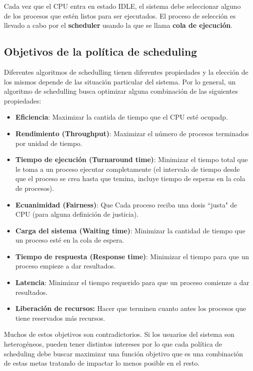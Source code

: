 	Cada vez que el CPU entra en estado IDLE, el sistema debe seleccionar alguno de los procesos que estén listos para ser ejecutados. El proceso de selección es llevado a cabo por el \textbf{scheduler} usando la que se llama \textbf{cola de ejecución}.
	
	\subsection{Objetivos de la política de scheduling}
	Diferentes algoritmos de schedulling tienen diferentes propiedades y la elección de los mismos depende de las situación particular del sistema. Por lo general, un algoritmo de schedulling busca optimizar alguna combinación de las siguientes propiedades:
	
	\begin{itemize}
		\item \textbf{Eficiencia}: Maximizar la cantida de tiempo que el CPU esté ocupadp.
		\item \textbf{Rendimiento (Throughput)}: Maximizar el número de procesos terminados por unidad de tiempo.
		\item \textbf{Tiempo de ejecución (Turnaround time)}: Minimizar el tiempo total que le toma a un proceso ejecutar completamente (el intervalo de tiempo desde que el proceso se crea hasta que temina, incluye tiempo de esperas en la cola de procesos).
		\item \textbf{Ecuanimidad (Fairness)}: Que Cada proceso reciba una dosis ``justa" de CPU (para alguna definición de justicia).
		\item \textbf{Carga del sistema (Waiting time)}: Minimizar la cantidad de tiempo que un proceso esté en la cola de espera.
		\item \textbf{Tiempo de respuesta (Response time)}: Minimizar el tiempo para que un proceso empieze a dar resultados.
		\item \textbf{Latencia}: Minimizar el tiempo requerido para que un proceso comienze a dar resultados.
		
		\item \textbf{Liberación de recursos:} Hacer que terminen cuanto antes los procesos que tiene reservados más recursos.
	\end{itemize}
	Muchos de estos objetivos son contradictorios. Si los usuarios del sistema son heterogéneos, pueden tener distintos intereses por lo que cada política de scheduling debe buscar maximizar una función objetivo que es una combinación de estas metas tratando de impactar lo menos posible en el resto.
	
